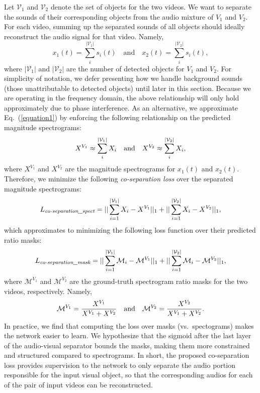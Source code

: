\documentclass[10pt,twocolumn,letterpaper]{article}
\begin{document}
Let $\mathcal{V}_1$ and $\mathcal{V}_2$ denote the set of objects for the two videos. We want to separate the sounds of their corresponding objects from the audio mixture of $V_1$ and $V_2$. For each video, summing up the separated sounds of all objects should ideally reconstruct the audio signal for that video. Namely, 
\vspace*{-0.05in}
\begin{equation}
	x_1(t) = \sum_{i}^{|\mathcal{V}_1|} s_i(t) \quad\text{and}\quad x_2(t) = \sum_{i}^{|\mathcal{V}_2|} s_i(t),
	\label{equation1}
\end{equation}
where $|\mathcal{V}_1|$ and $|\mathcal{V}_2|$ are the number of detected objects for $V_1$ and $V_2$. For simplicity of notation, we defer presenting how we handle background sounds (those unattributable to detected objects) until later in this section. Because we are operating in the frequency domain, the above relationship will only hold approximately due to phase interference.  As an alternative, we approximate Eq.~(\ref{equation1}) by enforcing the following relationship on the predicted magnitude spectrograms:
\begin{equation}
\vspace*{-0.05in}
	X^{V_1} \approx \sum_{i}^{|\mathcal{V}_1|} X_i \quad\text{and}\quad X^{V_2} \approx \sum_{i}^{|\mathcal{V}_2|} X_i,
\end{equation}
where $X^{V_1}$ and $X^{V_2}$ are the magnitude spectrograms for $x_1(t)$ and $x_2(t)$. Therefore, we minimize the following \emph{co-separation loss} over the separated magnitude spectrograms:
\begin{equation}
\vspace*{-0.05in}
	L_{\emph{co-separation\_spect}} = ||\sum_{i=1}^{|\mathcal{V}_1|} X_i - X^{V_1}||_1 + ||\sum_{i=1}^{|\mathcal{V}_2|} X_i - X^{V_2}||_1,
\end{equation}
which approximates to minimizing the following loss function over their predicted ratio masks:
\begin{equation}
\vspace*{-0.05in}
	L_{\emph{co-separation\_mask}} = ||\sum_{i=1}^{|\mathcal{V}_1|} \mathcal{M}_i - \mathcal{M}^{V_1}||_1 + ||\sum_{i=1}^{|\mathcal{V}_2|} \mathcal{M}_i - \mathcal{M}^{V_2}||_1,
	\label{eq:equation4}
\end{equation}
where $\mathcal{M}^{V_1}$ and $\mathcal{M}^{V_2}$ are the ground-truth spectrogram ratio masks for the two videos, respectively. Namely,
\begin{equation}
	\vspace{-0.05in}
	\mathcal{M}^{V_1} = \frac{X^{V_1}}{X^{V_1} + X^{V_2}}\quad\text{and}\quad \mathcal{M}^{V_2} = \frac{X^{V_2}}{X^{V_1} + X^{V_2}}.
\end{equation}
In practice, we find that computing the loss over masks (vs.~spectograms) makes the network easier to learn. We hypothesize that the sigmoid after the last layer of the audio-visual separator bounds the masks, making them more constrained and structured compared to spectrograms. In short, the proposed co-separation loss provides supervision to the network to only separate the audio portion responsible for the input visual object, so that the corresponding audios for each of the pair of input videos can be reconstructed.
\end{document}
